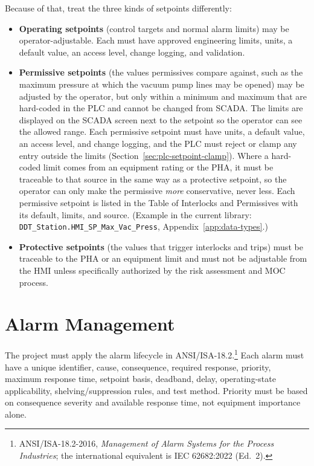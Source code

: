 Because of that, treat the three kinds of setpoints differently:
\begin{itemize}[itemsep=2pt]
  \item \textbf{Operating setpoints} (control targets and normal alarm limits) may be operator-adjustable. Each must have approved engineering limits, units, a default value, an access level, change logging, and validation.
  \item \textbf{Permissive setpoints} (the values permissives compare against, such as the maximum pressure at which the vacuum pump lines may be opened) may be adjusted by the operator, but only within a minimum and maximum that are hard-coded in the PLC and cannot be changed from SCADA. The limits are displayed on the SCADA screen next to the setpoint so the operator can see the allowed range. Each permissive setpoint must have units, a default value, an access level, and change logging, and the PLC must reject or clamp any entry outside the limits (Section~\ref{sec:plc-setpoint-clamp}). Where a hard-coded limit comes from an equipment rating or the PHA, it must be traceable to that source in the same way as a protective setpoint, so the operator can only make the permissive \emph{more} conservative, never less. Each permissive setpoint is listed in the Table of Interlocks and Permissives with its default, limits, and source. (Example in the current library: \texttt{DDT\_Station.HMI\_SP\_Max\_Vac\_Press}, Appendix~\ref{app:data-types}.)
  \item \textbf{Protective setpoints} (the values that trigger interlocks and trips) must be traceable to the PHA or an equipment limit and must not be adjustable from the HMI unless specifically authorized by the risk assessment and MOC process.
\end{itemize}

\section{Alarm Management}\label{sec:alarm-mgmt}

The project must apply the alarm lifecycle in ANSI/ISA-18.2.\footnote{ANSI/ISA-18.2-2016, \emph{Management of Alarm Systems for the Process Industries}; the international equivalent is IEC 62682:2022 (Ed.~2).} Each alarm must have a unique identifier, cause, consequence, required response, priority, maximum response time, setpoint basis, deadband, delay, operating-state applicability, shelving/suppression rules, and test method. Priority must be based on consequence severity and available response time, not equipment importance alone.

